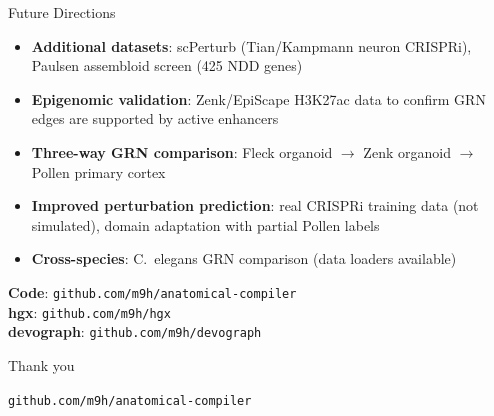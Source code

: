 \documentclass[aspectratio=169,11pt]{beamer}
\begin{document}
\begin{frame}{Future Directions}

\begin{itemize}
    \item \textbf{Additional datasets}: scPerturb (Tian/Kampmann neuron CRISPRi), Paulsen assembloid screen (425 NDD genes)
    \item \textbf{Epigenomic validation}: Zenk/EpiScape H3K27ac data to confirm GRN edges are supported by active enhancers
    \item \textbf{Three-way GRN comparison}: Fleck organoid $\rightarrow$ Zenk organoid $\rightarrow$ Pollen primary cortex
    \item \textbf{Improved perturbation prediction}: real CRISPRi training data (not simulated), domain adaptation with partial Pollen labels
    \item \textbf{Cross-species}: C.\ elegans GRN comparison (data loaders available)
\end{itemize}

\vspace{1em}

\centering
\textbf{Code}: \texttt{github.com/m9h/anatomical-compiler}\\
\textbf{hgx}: \texttt{github.com/m9h/hgx}\\
\textbf{devograph}: \texttt{github.com/m9h/devograph}

\end{frame}


\begin{frame}[standout]
\Large Thank you

\vspace{1em}
\normalsize
\texttt{github.com/m9h/anatomical-compiler}
\end{frame}


\appendix
\end{document}
